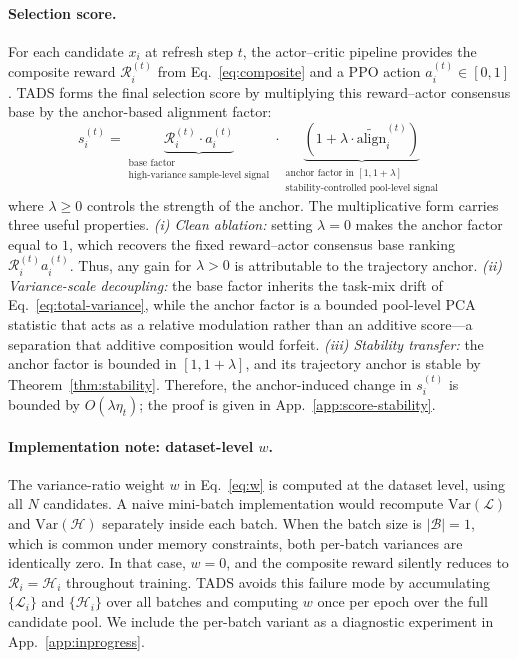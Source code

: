 \paragraph{Selection score.}
For each candidate $x_i$ at refresh step $t$, the actor--critic
pipeline provides the composite reward $\mathcal{R}_i^{(t)}$ from
Eq.~\ref{eq:composite} and a PPO action $a_i^{(t)} \in [0,1]$.
\textsc{TADS} forms the final selection score by multiplying this
reward--actor consensus base by the anchor-based alignment factor:
\begin{equation}
\boxed{
s_i^{(t)}
=
\underbrace{\mathcal{R}_i^{(t)} \cdot a_i^{(t)}}_{\substack{\text{base factor}\\[1pt]
\text{high-variance sample-level signal}}}
\cdot
\underbrace{
\left(1+\lambda \cdot \widetilde{\mathrm{align}}_i^{(t)}\right)
}_{\substack{\text{anchor factor in }[1,1+\lambda]\\[1pt]
\text{stability-controlled pool-level signal}}}
}
\label{eq:score}
\end{equation}
where $\lambda \ge 0$ controls the strength of the anchor. The
multiplicative form carries three useful properties. \emph{(i) Clean
ablation:} setting $\lambda=0$ makes the anchor factor equal to $1$,
which recovers the fixed reward--actor consensus base ranking
$\mathcal{R}_i^{(t)}a_i^{(t)}$. Thus, any gain for $\lambda>0$ is
attributable to the trajectory anchor. \emph{(ii) Variance-scale
decoupling:} the base factor inherits the task-mix drift of
Eq.~\ref{eq:total-variance}, while the anchor factor is a bounded
pool-level PCA statistic that acts as a relative modulation rather
than an additive score---a separation that additive composition would
forfeit. \emph{(iii) Stability transfer:} the anchor factor is
bounded in $[1,1+\lambda]$, and its trajectory anchor is stable by
Theorem~\ref{thm:stability}. Therefore, the anchor-induced change in
$s_i^{(t)}$ is bounded by $O(\lambda\eta_t)$; the proof is given in
App.~\ref{app:score-stability}.


\paragraph{Implementation note: dataset-level $w$.}
The variance-ratio weight $w$ in Eq.~\ref{eq:w} is computed at the
dataset level, using all $N$ candidates. A naive mini-batch
implementation would recompute $\mathrm{Var}(\mathcal{L})$ and
$\mathrm{Var}(\mathcal{H})$ separately inside each batch. When the
batch size is $|\mathcal{B}|=1$, which is common under memory
constraints, both per-batch variances are identically zero. In that
case, $w=0$, and the composite reward silently reduces to
$\mathcal{R}_i=\mathcal{H}_i$ throughout training. \textsc{TADS}
avoids this failure mode by accumulating $\{\mathcal{L}_i\}$ and
$\{\mathcal{H}_i\}$ over all batches and computing $w$ once per
epoch over the full candidate pool. We include the per-batch variant
as a diagnostic experiment in App.~\ref{app:inprogress}.





